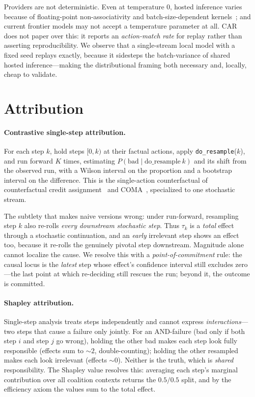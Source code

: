 \documentclass[11pt]{article}
\begin{document}
Providers are not deterministic. Even at temperature $0$, hosted inference varies because of
floating-point non-associativity and batch-size-dependent kernels~\cite{nondeterminism2025}; and
current frontier models may not accept a temperature parameter at all. CAR does not paper over
this: it reports an \emph{action-match rate} for replay rather than asserting reproducibility. We
observe that a single-stream local model with a fixed seed replays exactly, because it sidesteps
the batch-variance of shared hosted inference---making the distributional framing both necessary
and, locally, cheap to validate.

\section{Attribution}
\label{sec:attr}

\paragraph{Contrastive single-step attribution.}
For each step $k$, hold steps $[0,k)$ at their factual actions, apply \texttt{do\_resample}($k$),
and run forward $K$ times, estimating $P(\text{bad} \mid \mathrm{do\_resample}\ k)$ and its shift
from the observed run, with a Wilson interval on the proportion and a bootstrap interval on the
difference. This is the single-action counterfactual of counterfactual credit
assignment~\cite{mesnard2021} and COMA~\cite{coma2018}, specialized to one stochastic stream.

The subtlety that makes naive versions wrong: under run-forward, resampling step $k$ also re-rolls
\emph{every downstream stochastic step}. Thus $\tau_k$ is a \emph{total} effect through a
stochastic continuation, and an \emph{early} irrelevant step shows an effect too, because it
re-rolls the genuinely pivotal step downstream. Magnitude alone cannot localize the cause. We
resolve this with a \emph{point-of-commitment} rule: the causal locus is the \emph{latest} step
whose effect's confidence interval still excludes zero---the last point at which re-deciding still
rescues the run; beyond it, the outcome is committed.

\paragraph{Shapley attribution.}
Single-step analysis treats steps independently and cannot express \emph{interactions}---two steps
that cause a failure only jointly. For an AND-failure (bad only if both step $i$ and step $j$ go
wrong), holding the other bad makes each step look fully responsible (effects sum to $\sim2$,
double-counting); holding the other resampled makes each look irrelevant (effects $\sim0$). Neither
is the truth, which is \emph{shared} responsibility. The Shapley value resolves this: averaging
each step's marginal contribution over all coalition contexts returns the $0.5/0.5$ split, and by
the efficiency axiom the values sum to the total effect.
\end{document}
